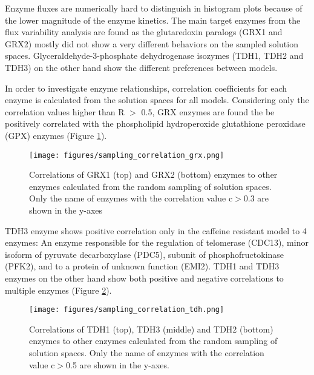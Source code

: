 Enzyme fluxes are numerically hard to distinguish in histogram plots because of the lower magnitude of the enzyme kinetics. The main target enzymes from the flux variability analysis are found as the glutaredoxin paralogs (GRX1 and GRX2) mostly did not show a very different behaviors on the sampled solution spaces. Glyceraldehyde-3-phosphate dehydrogenase isozymes (TDH1, TDH2 and TDH3) on the other hand show the different preferences between models.

In order to investigate enzyme relationships, correlation coefficients for each enzyme is calculated from the solution spaces for all models. Considering only the correlation values higher than R $>$ 0.5, GRX enzymes are found the be positively correlated with the phospholipid hydroperoxide glutathione peroxidase (GPX) enzymes (Figure \ref{fig:sampling_correlation_grx}).

\begin{figure}[H]
  \begin{center}
  \texttt{[image: figures/sampling\_correlation\_grx.png]}
  \caption[Correlations of GRX1 (top) and GRX2 (bottom) enzymes to other enzymes calculated from the random sampling of solution spaces. Only the name of enzymes with the correlation value c$>$0.8 are shown in the y-axes]{Correlations of GRX1 (top) and GRX2 (bottom) enzymes to other enzymes calculated from the random sampling of solution spaces. Only the name of enzymes with the correlation value c$>$0.3 are shown in the y-axes}
  \label{fig:sampling_correlation_grx}
  \end{center}
\end{figure}

TDH3 enzyme shows positive correlation only in the caffeine resistant model to 4 enzymes: An enzyme responsible for the regulation of telomerase (CDC13), minor isoform of pyruvate decarboxylase (PDC5), subunit of phosphofructokinase (PFK2), and to a protein of unknown function (EMI2). TDH1 and TDH3 enzymes on the other hand show both positive and negative correlations to multiple enzymes (Figure \ref{fig:sampling_correlation_tdh}).

\begin{figure}[H]
  \begin{center}
  \texttt{[image: figures/sampling\_correlation\_tdh.png]}
  \caption[Correlations of TDH1 (top), TDH3 (middle) and TDH2 (bottom) enzymes to other enzymes calculated from the random sampling of solution spaces. Only the name of enzymes with the correlation value c$>$0.5 are shown in the y-axes]{Correlations of TDH1 (top), TDH3 (middle) and TDH2 (bottom) enzymes to other enzymes calculated from the random sampling of solution spaces. Only the name of enzymes with the correlation value c$>$0.5 are shown in the y-axes.}
  \label{fig:sampling_correlation_tdh}
  \end{center}
\end{figure}


